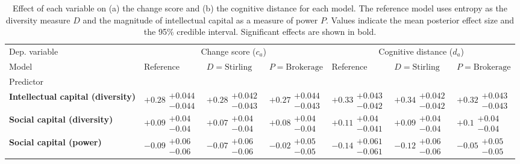 \begin{table}[H]
\caption{Effect of each variable on (a) the change score and (b) the cognitive distance for each model. The reference model uses entropy as the diversity measure $D$ and the magnitude of intellectual capital as a measure of power $P$. Values indicate the mean posterior effect size and the 95\% credible interval. Significant effects are shown in bold.}
\label{table:summary_change_disruption}
\renewcommand{\arraystretch}{2}\fontsize{6}{7}\selectfont\begin{tabular}{lllllll}
\toprule
Dep. variable & \multicolumn{3}{c}{Change score ($c_a$)} & \multicolumn{3}{c}{Cognitive distance ($d_a$)} \\
Model & Reference & $D=\text{Stirling}$ & $P=\text{Brokerage}$ & Reference & $D=\text{Stirling}$ & $P=\text{Brokerage}$ \\
Predictor &  &  &  &  &  &  \\
\midrule
\textbf{Intellectual capital (diversity)} & $\bm{+0.28}\substack{+0.044 \\ -0.044}$ & $\bm{+0.28}\substack{+0.042 \\ -0.043}$ & $\bm{+0.27}\substack{+0.044 \\ -0.043}$ & $\bm{+0.33}\substack{+0.043 \\ -0.042}$ & $\bm{+0.34}\substack{+0.042 \\ -0.042}$ & $\bm{+0.32}\substack{+0.043 \\ -0.043}$ \\
\textbf{Social capital (diversity)} & $\bm{+0.09}\substack{+0.04 \\ -0.04}$ & $\bm{+0.07}\substack{+0.04 \\ -0.04}$ & $\bm{+0.08}\substack{+0.04 \\ -0.04}$ & $\bm{+0.11}\substack{+0.04 \\ -0.041}$ & $\bm{+0.09}\substack{+0.04 \\ -0.04}$ & $\bm{+0.1}\substack{+0.04 \\ -0.04}$ \\
\textbf{Social capital (power)} & $\bm{-0.09}\substack{+0.06 \\ -0.06}$ & $\bm{-0.07}\substack{+0.06 \\ -0.06}$ & $-0.02\substack{+0.05 \\ -0.05}$ & $\bm{-0.14}\substack{+0.061 \\ -0.061}$ & $\bm{-0.12}\substack{+0.06 \\ -0.06}$ & $-0.05\substack{+0.05 \\ -0.05}$ \\

\end{tabular}
\end{table}
